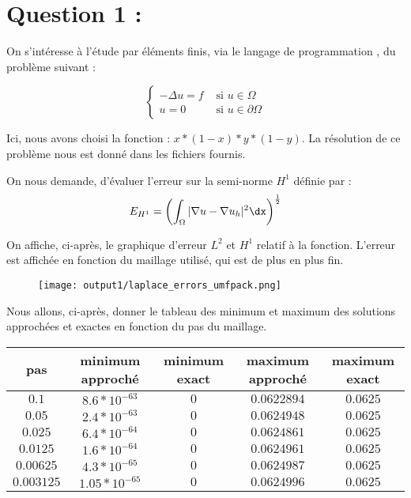 \documentclass[11pt,a4paper]{report}
\begin{document}
	
	\section*{Question 1 :}
		
		On s'intéresse à l'étude par éléments finis, via le langage de programmation , du problème suivant : 
			
		\[
			\left\{
			\begin{array}{ll}
			- \Delta u = f & \mbox{ si } u \in \Omega \\
			u = 0 & \mbox{ si } u \in \partial\Omega
			\end{array}
			\right.
		\]
		
		Ici, nous avons choisi la fonction : $x*(1-x)*y*(1-y)$. La résolution de ce problème nous est donné dans les fichiers fournis.
		
		On nous demande, d'évaluer l'erreur sur la semi-norme $H^1$ définie par : 
		\[
			E_{H^1} = \displaystyle \left(\int_{\Omega} |\nabla u - \nabla u_h|^2 \dx \right)^{\frac{1}{2}}
		\]
		
		On affiche, ci-après, le graphique d'erreur $L^2$ et $H^1$ relatif à la fonction. L'erreur est affichée en fonction du maillage utilisé, qui est de plus en plus fin.
		
		\begin{figure}[H]
			\centering
			\texttt{[image: output1/laplace\_errors\_umfpack.png]}
		\end{figure}
		
		Nous allons, ci-après, donner le tableau des minimum et maximum des solutions approchées et exactes en fonction du pas du maillage.
		
		
		\begin{center}
			\begin{tabular}{|c|c|c|c|c|}
				\hline
				pas & minimum approché & minimum exact & maximum approché & maximum exact \\
				\hline 
				$0.1$ & $8.6*10^{-63}$ & $0$ & $0.0622894$ & $0.0625$\\ 
				\hline 
				$0.05$ & $2.4*10^{-63}$ & $0$ & $0.0624948$ & $0.0625$\\ 
				\hline 
				$0.025$ & $6.4*10^{-64}$ & $0$ & $0.0624861$ & $0.0625$  \\ 
				\hline 
				$0.0125$ & $1.6*10^{-64}$ & $0$ & $0.0624961$ & $0.0625$\\ 
				\hline 
				$0.00625$ & $4.3*10^{-65}$ & $0$ & $0.0624987$ & $0.0625$ \\ 
				\hline 
				$0.003125$ & $1.05*10^{-65}$ & $0$ & $0.0624996$ & $0.0625$ \\ 
				\hline 
			\end{tabular} 
		\end{center}
			
\end{document}
